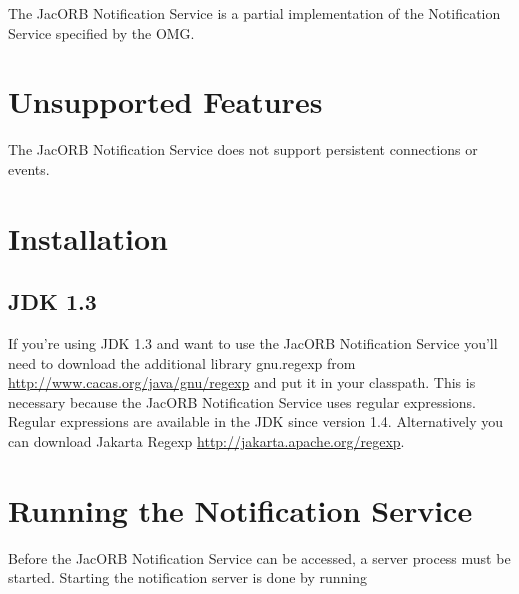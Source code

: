 %
%

The JacORB Notification Service is a partial implementation of
the Notification Service specified by the OMG.

\section{Unsupported Features}

The JacORB Notification Service does not support persistent connections or events.

\section{Installation}
\label{sec:installation}

\subsection{JDK 1.3}

If you're using JDK 1.3 and want to use the JacORB Notification
Service you'll need
to download the additional library gnu.regexp from
\href{http://www.cacas.org/java/gnu/regexp}{http://www.cacas.org/java/gnu/regexp}
and put it in your classpath. This is necessary because the JacORB
Notification Service uses regular expressions. Regular expressions are available in the JDK since version 1.4. Alternatively
you can download Jakarta Regexp \href{http://jakarta.apache.org/regexp}{http://jakarta.apache.org/regexp}.

\section{Running the Notification Service}
\label{sec:ntfy-running}

Before the JacORB Notification Service can be accessed, a server
process must be started. Starting
the notification server is done by running


